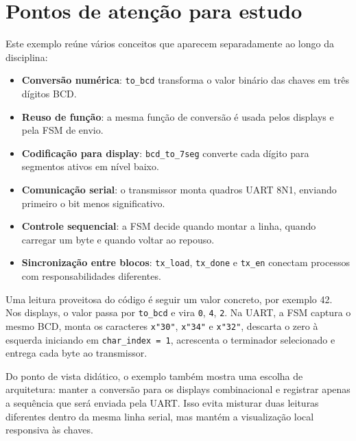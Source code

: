 \documentclass[12pt,a4paper]{book}
\begin{document}
\section{Pontos de atenção para estudo}

Este exemplo reúne vários conceitos que aparecem separadamente ao longo da disciplina:

\begin{itemize}
  \item \textbf{Conversão numérica}: \texttt{to\_bcd} transforma o valor binário das chaves em três dígitos BCD.
  \item \textbf{Reuso de função}: a mesma função de conversão é usada pelos displays e pela FSM de envio.
  \item \textbf{Codificação para display}: \texttt{bcd\_to\_7seg} converte cada dígito para segmentos ativos em nível baixo.
  \item \textbf{Comunicação serial}: o transmissor monta quadros UART 8N1, enviando primeiro o bit menos significativo.
  \item \textbf{Controle sequencial}: a FSM decide quando montar a linha, quando carregar um byte e quando voltar ao repouso.
  \item \textbf{Sincronização entre blocos}: \texttt{tx\_load}, \texttt{tx\_done} e \texttt{tx\_en} conectam processos com responsabilidades diferentes.
\end{itemize}

Uma leitura proveitosa do código é seguir um valor concreto, por exemplo 42. Nos displays, o valor passa por \texttt{to\_bcd} e vira \texttt{0}, \texttt{4}, \texttt{2}. Na UART, a FSM captura o mesmo BCD, monta os caracteres \texttt{x"30"}, \texttt{x"34"} e \texttt{x"32"}, descarta o zero à esquerda iniciando em \texttt{char\_index = 1}, acrescenta o terminador selecionado e entrega cada byte ao transmissor.

Do ponto de vista didático, o exemplo também mostra uma escolha de arquitetura: manter a conversão para os displays combinacional e registrar apenas a sequência que será enviada pela UART. Isso evita misturar duas leituras diferentes dentro da mesma linha serial, mas mantém a visualização local responsiva às chaves.



\end{document}
